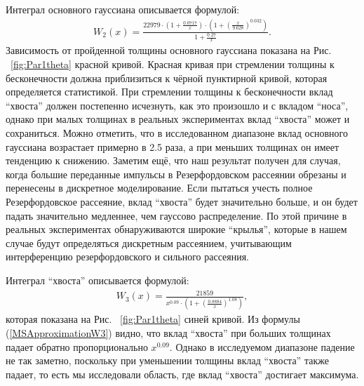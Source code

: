 \documentclass[a4paper,12pt]{article}
\begin{document}
\begin{large}
Интеграл основного гауссиана описывается формулой:
\begin{equation}
\label{MSApproximationW2}
\begin{aligned} 
W_2(x)= \frac{22979\cdot \left(1+\frac{0.0717}{x}\right)\cdot \left(1+\left(\frac{x}{9.628}\right)^{0.032}\right)}{1+\frac{0.27}{x}}.
\end{aligned}
\end{equation}
  Зависимость от пройденной толщины основного гауссиана показана на Рис. ~\ref{fig:Par1theta} красной кривой.
  Красная кривая при стремлении толщины к бесконечности должна приблизиться к чёрной пунктирной кривой, которая определяется статистикой.
  При стремлении толщины к бесконечности вклад ``хвоста'' должен постепенно исчезнуть, как это произошло и с вкладом ``носа'', однако при малых толщинах в реальных экспериментах вклад ``хвоста'' может и сохраниться.
  Можно отметить, что в исследованном диапазоне вклад основного гауссиана возрастает примерно в 2.5 раза, а при меньших толщинах он имеет тенденцию к снижению.
  Заметим ещё, что наш результат получен для случая, когда большие переданные импульсы в Резерфордовском рассеянии обрезаны и перенесены в дискретное моделирование.
  Если пытаться учесть полное Резерфордовское рассеяние, вклад ``хвоста'' будет значительно больше, и он будет падать значительно медленнее, чем гауссово распределение.
  По этой причине в реальных экспериментах обнаруживаются широкие ``крылья'', которые в нашем случае будут определяться дискретным рассеянием, учитывающим интерференцию резерфордовского и сильного рассеяния.

Интеграл ``хвоста'' описывается формулой:
\begin{equation}
\label{MSApproximationW3}
\begin{aligned} 
W_3(x)= \frac{21859}{x^{0.09}\cdot\left(1+\left(\frac{0.8884}{x}\right)^{1.08}\right)},
\end{aligned}
\end{equation}
  которая показана на Рис. ~\ref{fig:Par1theta} синей кривой.
  Из формулы (\ref{MSApproximationW3}) видно, что вклад ``хвоста'' при больших толщинах падает обратно пропорционально $x^{0.09}$.
  Однако в исследуемом диапазоне падение не так заметно, поскольку при уменьшении толщины вклад ``хвоста'' также падает, то есть мы исследовали область, где вклад ``хвоста'' достигает максимума.
  

\end{large}
\end{document}
